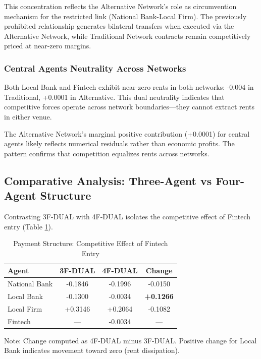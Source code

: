 This concentration reflects the Alternative Network's role as circumvention mechanism for the restricted link (National Bank-Local Firm). The previously prohibited relationship generates bilateral transfers when executed via the Alternative Network, while Traditional Network contracts remain competitively priced at near-zero margins.

\subsubsection{Central Agents Neutrality Across Networks}

Both Local Bank and Fintech exhibit near-zero rents in both networks: -0.004 in Traditional, +0.0001 in Alternative. This dual neutrality indicates that competitive forces operate across network boundaries—they cannot extract rents in either venue.

The Alternative Network's marginal positive contribution (+0.0001) for central agents likely reflects numerical residuals rather than economic profits. The pattern confirms that competition equalizes rents across networks.

\subsection{Comparative Analysis: Three-Agent vs Four-Agent Structure}

Contrasting 3F-DUAL with 4F-DUAL isolates the competitive effect of Fintech entry (Table \ref{tab:3f_vs_4f_rents}).

\begin{table}[ht]
\centering
\caption{Payment Structure: Competitive Effect of Fintech Entry}
\label{tab:3f_vs_4f_rents}
\begin{tabular}{lccc}
\toprule
\textbf{Agent} & \textbf{3F-DUAL} & \textbf{4F-DUAL} & \textbf{Change}  \\
\midrule
National Bank  & -0.1846 & -0.1996 & -0.0150  \\
Local Bank     & -0.1300 & -0.0034 & \textbf{+0.1266} \\
Local Firm     & +0.3146 & +0.2064 & -0.1082 \\
Fintech        & — & -0.0034 & —  \\
\bottomrule
\end{tabular}
\begin{tablenotes}
\small
\item Note: Change computed as 4F-DUAL minus 3F-DUAL. Positive change for Local Bank indicates movement toward zero (rent dissipation).
\end{tablenotes}
\end{table}


